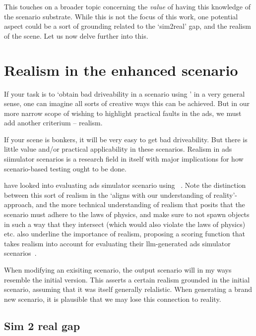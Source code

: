 This touches on a broader topic concerning the \emph{value} of having this knowledge of the
scenario substrate. While this is not the focus of this work, one potential aspect could be a sort
of grounding related to the `sim2real' gap, and the realism of the scene. Let us now delve further
into this.

\section{Realism in the enhanced scenario}

If your task is to `obtain bad driveability in a scenario using ' in a very general
sense, one can imagine all sorts of creative ways this can be achieved. But in our more narrow scope
of wishing to highlight practical faults in the \acrshort{ads}, we must add another criterium --
realism.

If your scene is bonkers, it will be very easy to get bad driveability. But there is little value
and/or practical applicability in these scenarios. Realism in \acrshort{ads} siimulator scenarios is
a research field in itself with major implications for how scenario-based testing ought to be done.

\citeauthor{RealityBites} have looked into evaluating \acrshort{ads} simulator scenario using
~\cite[40]{RealityBites}. Note the distinction between this sort of realism in the
`aligns with our understanding of reality'-approach, and the more technical understanding of realism
that posits that the scenario must adhere to the laws of physics, and make sure to not spawn objects
in such a way that they intersect (which would also violate the laws of physics) etc.
\citeauthor{LLMScenarioChang24} also underline the importance of realism, proposing a scoring
function that takes realism into account for evaluating their \acrshort{llm}-generated
\acrshort{ads} simulator scenarios~\cite[6581-6582]{LLMScenarioChang24}.

When modifying an exisiting scenario, the output scenario will in my ways resemble the initial
version. This asserts a certain realism grounded in the initial scenario, assuming that it was
itself generally relalistic. When generating a brand new scenario, it is plausible that we may lose
this connection to reality.

\subsection{Sim 2 real gap}

